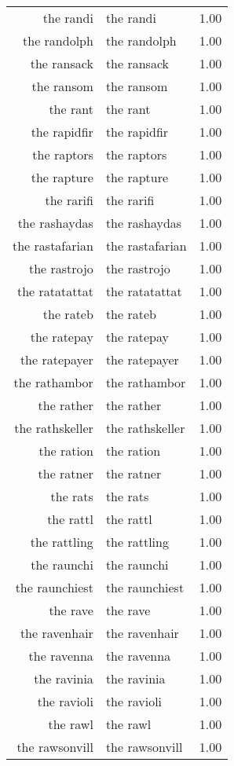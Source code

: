\begin{table}[ht]
\begin{tabular}{rlr}
  the randi & the randi & 1.00 \\ 
  the randolph & the randolph & 1.00 \\ 
  the ransack & the ransack & 1.00 \\ 
  the ransom & the ransom & 1.00 \\ 
  the rant & the rant & 1.00 \\ 
  the rapidfir & the rapidfir & 1.00 \\ 
  the raptors & the raptors & 1.00 \\ 
  the rapture & the rapture & 1.00 \\ 
  the rarifi & the rarifi & 1.00 \\ 
  the rashaydas & the rashaydas & 1.00 \\ 
  the rastafarian & the rastafarian & 1.00 \\ 
  the rastrojo & the rastrojo & 1.00 \\ 
  the ratatattat & the ratatattat & 1.00 \\ 
  the rateb & the rateb & 1.00 \\ 
  the ratepay & the ratepay & 1.00 \\ 
  the ratepayer & the ratepayer & 1.00 \\ 
  the rathambor & the rathambor & 1.00 \\ 
  the rather & the rather & 1.00 \\ 
  the rathskeller & the rathskeller & 1.00 \\ 
  the ration & the ration & 1.00 \\ 
  the ratner & the ratner & 1.00 \\ 
  the rats & the rats & 1.00 \\ 
  the rattl & the rattl & 1.00 \\ 
  the rattling & the rattling & 1.00 \\ 
  the raunchi & the raunchi & 1.00 \\ 
  the raunchiest & the raunchiest & 1.00 \\ 
  the rave & the rave & 1.00 \\ 
  the ravenhair & the ravenhair & 1.00 \\ 
  the ravenna & the ravenna & 1.00 \\ 
  the ravinia & the ravinia & 1.00 \\ 
  the ravioli & the ravioli & 1.00 \\ 
  the rawl & the rawl & 1.00 \\ 
  the rawsonvill & the rawsonvill & 1.00 \\ 

\end{tabular}
\end{table}
